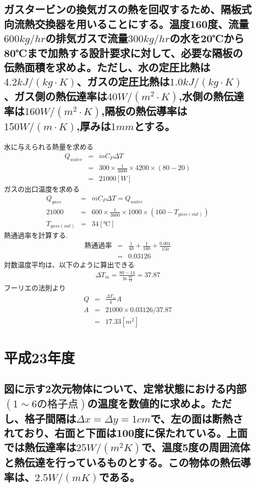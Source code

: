 \documentclass[a4j,twoside,openright,11pt]{jreport}
\begin{document}
\section{ガスタービンの換気ガスの熱を回収するため、隔板式向流熱交換器を用いることにする。温度160度、流量$600kg/hr$の排気ガスで流量$300kg/hr$の水を20℃から80℃まで加熱する設計要求に対して、必要な隔板の伝熱面積を求めよ。ただし、水の定圧比熱は$4.2kJ/(kg \cdot K)$、ガスの定圧比熱は$1.0kJ/(kg \cdot K)$、ガス側の熱伝達率は$40W/(m^2 \cdot K)$,水側の熱伝達率は$160W/(m^2 \cdot K)$,隔板の熱伝導率は$150W/(m \cdot K)$,厚みは$1mm$とする。}

水に与えられる熱量を求める
\begin{eqnarray}
Q_{water} &=& \dot m C_P \Delta T\\
  &=& 300 \times \frac{1}{3600} \times 4200 \times (80-20)\\
  &=& 21000[W]
\end{eqnarray}
ガスの出口温度を求める
\begin{eqnarray}
Q_{gass}   &=& \dot m C_P \Delta T = Q_{water}\\
21000     &=& 600 \times \frac{1}{3600} \times 1000 \times (160-T_{gass(out)})\\
 T_{gass(out)}        &=& 34[℃]
\end{eqnarray}
熱通過率を計算する.
\begin{eqnarray}
熱通過率 &=& \frac{1}{40} + \frac{1}{160} + \frac{0.001}{150}\\
&=&0.03126
\end{eqnarray}
対数温度平均は、以下のように算出できる
\begin{eqnarray}
\Delta T_m = \frac{80-14}{\ln \frac{80}{14}} = 37.87
\end{eqnarray}
フーリエの法則より
\begin{eqnarray}
Q &=& \frac{\Delta T_m}{k}A\\
A &=& 21000 \times 0.03126 / 37.87\\
&=& 17.33[m^2]
\end{eqnarray}

\chapter{平成23年度}
\section{図に示す2次元物体について、定常状態における内部$(1\sim 6の格子点)$の温度を数値的に求めよ。ただし、格子間隔は$\Delta x = \Delta y =1cm$で、左の面は断熱されており、右面と下面は100度に保たれている。上面では熱伝達率は$25W/(m^2K)$で、温度5度の周囲流体と熱伝達を行っているものとする。この物体の熱伝導率は、$2.5W/(mK)$である。}
\end{document}
